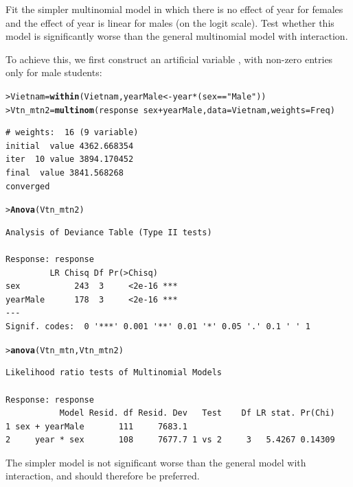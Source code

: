 \documentclass[10pt]{report}\usepackage[]{graphicx}\usepackage[]{color}
\makeatletter
\newcommand{\hlstr}[1]{\textcolor[rgb]{0.192,0.494,0.8}{#1}}%
\newcommand{\hlopt}[1]{\textcolor[rgb]{0,0,0}{#1}}%
\newcommand{\hlstd}[1]{\textcolor[rgb]{0.345,0.345,0.345}{#1}}%
\newcommand{\hlkwb}[1]{\textcolor[rgb]{0.69,0.353,0.396}{#1}}%
\newcommand{\hlkwc}[1]{\textcolor[rgb]{0.333,0.667,0.333}{#1}}%
\newcommand{\hlkwd}[1]{\textcolor[rgb]{0.737,0.353,0.396}{\textbf{#1}}}%
\newenvironment{kframe}{%
 \def\at@end@of@kframe{}%
 \ifinner\ifhmode%
  \def\at@end@of@kframe{\end{minipage}}%
  \begin{minipage}{\columnwidth}%
 \fi\fi%
 \def\FrameCommand##1{\hskip\@totalleftmargin \hskip-\fboxsep
 \colorbox{shadecolor}{##1}\hskip-\fboxsep
     \hskip-\linewidth \hskip-\@totalleftmargin \hskip\columnwidth}%
 \MakeFramed {\advance\hsize-\width
   \@totalleftmargin\z@ \linewidth\hsize
   \@setminipage}}%
 {\par\unskip\endMakeFramed%
 \at@end@of@kframe}
\newenvironment{knitrout}{}{} %
\renewenvironment{knitrout}{\small\renewcommand{\baselinestretch}{.85}}{} %
\makeatother
\begin{document}
\begin{Exercises}
\begin{enumerate*}
    \item Fit the simpler multinomial model in which there is no effect of year for females and the effect of
    year is linear for males (on the logit scale).  Test whether this model is significantly worse than the
    general multinomial model with interaction.
    \begin{ans}
    To achieve this, we first construct an artificial variable
    , with non-zero entries only for male students:
\begin{knitrout}\footnotesize
{}\color{fgcolor}\begin{kframe}
\begin{alltt}
\hlstd{> }\hlstd{Vietnam} \hlkwb{=} \hlkwd{within}\hlstd{(Vietnam, yearMale} \hlkwb{<-} \hlstd{year} \hlopt{*} \hlstd{(sex} \hlopt{==} \hlstr{"Male"}\hlstd{))}
\hlstd{> }\hlstd{Vtn_mtn2} \hlkwb{=} \hlkwd{multinom}\hlstd{(response} \hlopt{~} \hlstd{sex} \hlopt{+} \hlstd{yearMale,} \hlkwc{data} \hlstd{= Vietnam,} \hlkwc{weights} \hlstd{= Freq)}
\end{alltt}
\begin{verbatim}
# weights:  16 (9 variable)
initial  value 4362.668354 
iter  10 value 3894.170452
final  value 3841.568268 
converged
\end{verbatim}
\begin{alltt}
\hlstd{> }\hlkwd{Anova}\hlstd{(Vtn_mtn2)}
\end{alltt}
\begin{verbatim}
Analysis of Deviance Table (Type II tests)

Response: response
         LR Chisq Df Pr(>Chisq)    
sex           243  3     <2e-16 ***
yearMale      178  3     <2e-16 ***
---
Signif. codes:  0 '***' 0.001 '**' 0.01 '*' 0.05 '.' 0.1 ' ' 1
\end{verbatim}
\begin{alltt}
\hlstd{> }\hlkwd{anova}\hlstd{(Vtn_mtn, Vtn_mtn2)}
\end{alltt}
\begin{verbatim}
Likelihood ratio tests of Multinomial Models

Response: response
           Model Resid. df Resid. Dev   Test    Df LR stat. Pr(Chi)
1 sex + yearMale       111     7683.1                              
2     year * sex       108     7677.7 1 vs 2     3   5.4267 0.14309
\end{verbatim}
\end{kframe}
\end{knitrout}
    The simpler model is not significant worse than the general model
    with interaction, and should therefore be preferred.
    \end{ans}
    
  \end{enumerate*}
  

\end{Exercises}
\end{document}
